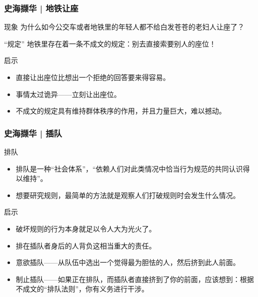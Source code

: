 \begin{frame}
  \frametitle{史海撷华 | 地铁让座}
  \begin{block}{现象}
    为什么如今公交车或者地铁里的年轻人都不给白发苍苍的老妇人让座了？
  \end{block}
  \pause
  \begin{block}{“规定”}
    地铁里存在着一条不成文的规定：别去直接索要别人的座位！
  \end{block}
  \pause
  \begin{block}{启示}
    \begin{itemize}
      \item 直接让出座位比想出一个拒绝的回答要来得容易。
      \item 事情太过诡异——立刻让出座位。
      \item 不成文的规定具有维持群体秩序的作用，并且力量巨大，难以撼动。
    \end{itemize}
  \end{block}
\end{frame}

\begin{frame}
  \frametitle{史海撷华 | 插队}
  \begin{block}{排队}
    \begin{itemize}
      \item 排队是一种“社会体系”，“依赖人们对此类情况中恰当行为规范的共同认识得以维持”。
      \item 想要研究规则，最简单的方法就是观察人们打破规则时会发生什么情况。
    \end{itemize}
  \end{block}
  \pause
  \begin{block}{启示}
    \begin{itemize}
      \item 破坏规则的行为本身就足以令人大为光火了。
      \item 排在插队者身后的人背负这相当重大的责任。
      \item 意欲插队——从队伍中选出一个觉得最为胆怯的人，然后挤到此人前面。
      \item 制止插队——如果正在排队，而插队者直接挤到了你的前面，应该想到：根据不成文的“排队法则”，你有义务进行干涉。
    \end{itemize}
  \end{block}
\end{frame}

